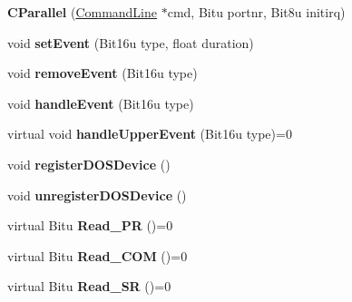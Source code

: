 \begin{DoxyCompactItemize}
\item 
\hypertarget{classCParallel_acf40d6322cbb27b3dbdadb98f5b85d8a}{{\bfseries C\-Parallel} (\hyperlink{classCommandLine}{Command\-Line} $\ast$cmd, Bitu portnr, Bit8u initirq)}\label{classCParallel_acf40d6322cbb27b3dbdadb98f5b85d8a}

\item 
\hypertarget{classCParallel_abf2ac9e3a37c8c0d0e04c42b85353ff8}{void {\bfseries set\-Event} (Bit16u type, float duration)}\label{classCParallel_abf2ac9e3a37c8c0d0e04c42b85353ff8}

\item 
\hypertarget{classCParallel_ae8b1a2d75783b8910371658d2784e150}{void {\bfseries remove\-Event} (Bit16u type)}\label{classCParallel_ae8b1a2d75783b8910371658d2784e150}

\item 
\hypertarget{classCParallel_a2f7e311564f795b2b7e80f131e94df8a}{void {\bfseries handle\-Event} (Bit16u type)}\label{classCParallel_a2f7e311564f795b2b7e80f131e94df8a}

\item 
\hypertarget{classCParallel_a7b4408fa33daf8df3d4a8ef800966e03}{virtual void {\bfseries handle\-Upper\-Event} (Bit16u type)=0}\label{classCParallel_a7b4408fa33daf8df3d4a8ef800966e03}

\item 
\hypertarget{classCParallel_a423399d97f72d64a7dc428a34f89a8c6}{void {\bfseries register\-D\-O\-S\-Device} ()}\label{classCParallel_a423399d97f72d64a7dc428a34f89a8c6}

\item 
\hypertarget{classCParallel_a1f7db7d51592a4053ac68aacee0d57aa}{void {\bfseries unregister\-D\-O\-S\-Device} ()}\label{classCParallel_a1f7db7d51592a4053ac68aacee0d57aa}

\item 
\hypertarget{classCParallel_a0d3e8a0777483495a14153fadcab6544}{virtual Bitu {\bfseries Read\-\_\-\-P\-R} ()=0}\label{classCParallel_a0d3e8a0777483495a14153fadcab6544}

\item 
\hypertarget{classCParallel_ae29345363bf6142ff5279f0a5db34fe0}{virtual Bitu {\bfseries Read\-\_\-\-C\-O\-M} ()=0}\label{classCParallel_ae29345363bf6142ff5279f0a5db34fe0}

\item 
\hypertarget{classCParallel_a5ab6eb5ec5cff6ca661fa04cede7c6de}{virtual Bitu {\bfseries Read\-\_\-\-S\-R} ()=0}\label{classCParallel_a5ab6eb5ec5cff6ca661fa04cede7c6de}


\end{DoxyCompactItemize}
